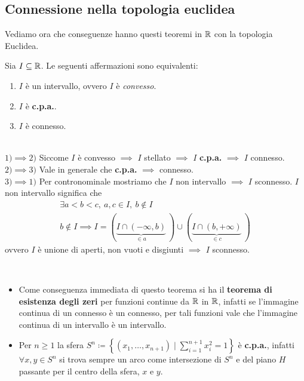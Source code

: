 \subsection{Connessione nella topologia euclidea}
Vediamo ora che conseguenze hanno questi teoremi in $\mathbb{R}$ con la topologia Euclidea.
\begin{theorema}
	Sia $I\subseteq \mathbb{R}$. Le seguenti affermazioni sono equivalenti:
		\begin{enumerate}
	\item $I$ è un intervallo, ovvero $I$ è \textit{convesso}.
	\item $I$ è \textbf{c.p.a.}.
	\item $I$ è connesso.
		\end{enumerate}
	\vspace{-3mm}
\end{theorema}
\begin{demonstration}~{}\\
	$1) \implies 2)$ Siccome $I$ è convesso $\implies$ $I$ stellato $\implies$ $I$ \textbf{c.p.a.} $\implies$ $I$ connesso. \\
	$2) \implies 3)$ Vale in generale che \textbf{c.p.a.} $\implies$ connesso.\\
	$3) \implies 1)$ Per contronominale mostriamo che $I$ non intervallo $\implies$ $I$ sconnesso. $I$ non intervallo significa che
		\begin{gather*}
			\exists a<b<c,\ a,c\in I,\ b\notin I \\
			b\notin I \implies I= \left(\underbrace{ I\cap \left(-\infty ,b\right)}_{\in a}\ \right) \cup \left( \underbrace{I\cap \left(b ,+\infty\right)}_{\in c}\ \right)
		\end{gather*}
	ovvero $I$ è unione di aperti, non vuoti e disgiunti $\implies$ $I$ sconnesso.	
\end{demonstration}
\begin{observe}~{}\label{teorema esistenza zeri funzioni continue, s^n cpa}
		\begin{itemize}
	\item Come conseguenza immediata di questo teorema si ha il \textbf{teorema di esistenza degli zeri} per funzioni continue da $\mathbb{R}$ in $\mathbb{R}$, infatti se l'immagine continua di un connesso è un connesso, per tali funzioni vale che l'immagine continua di un intervallo è un intervallo.
	\item Per $n\geq 1$ la sfera $\displaystyle S^n \coloneqq \left\{ \left(x_1,\dots,x_{n+1}\right) \mid \sum_{i=1}^{n+1}x_i^2=1 \right\}$ è \textbf{c.p.a.}, infatti $\forall x,y\in S^n$ si trova sempre un arco come intersezione di $S^n$ e del piano $H$ passante per il centro della sfera, $x$ e $y$.
		\end{itemize}
	\vspace{-3mm}
\end{observe}
